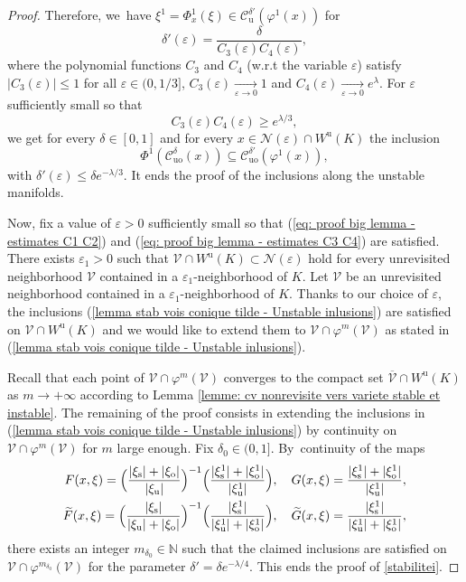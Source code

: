 \documentclass[JEP,XML,SOM,Unicode,NoEqCountersInSection,NoFloatCountersInSection,published]{cedram}
\newcommand{\ro}{\mathrm{o}}
\newcommand{\rs}{\mathrm{s}}
\newcommand{\ru}{\mathrm{u}}
\newcommand{\ruo}{\mathrm{uo}}
\theoremstyle{definition}
\theoremstyle{plain}
\newcommand{\Ccal}{\mathcal{C}}
\newcommand{\Ncal}{\mathcal{N}}
\newcommand{\N}{\mathbb{N}}
\newcommand{\Vcal}{\mathcal{V}}
\begin{document}
\begin{proof}
Therefore, we~have $\xi^1 = \Phi_x^1 (\xi) \in \Ccal_\ru^{\delta'}(\varphi^1 (x))$ for
\[
\delta'(\varepsilon) = \frac{\delta }{C_3 (\varepsilon) C_4 (\varepsilon)},
\]
where the polynomial functions $C_3$ and $C_4$ (w.r.t the variable $\varepsilon$) satisfy $|C_3 (\varepsilon)| \leq 1$ for all $\varepsilon\in(0,1/3]$, $ C_3 (\varepsilon) \underset{\varepsilon \to 0}{\to} 1$ and $C_4 (\varepsilon) \underset{\varepsilon \to 0}{\to} e^{\lambda}$. For $\varepsilon$ sufficiently small so that
\begin{equation}\label{eq: proof big lemma - estimates C3 C4}
C_3 (\varepsilon) C_4 (\varepsilon) \geq e^{\lambda/3},
\end{equation}
we get for every $\delta\in[0,1]$ and for every $x \in \Ncal (\varepsilon) \cap W^\ru(K)$ the inclusion
\[
\Phi^{1}\left(\Ccal_{\ruo}^{\delta}(x)\right) \subseteq \Ccal_{\ruo}^{\delta'}(\varphi^{1}(x)),
\]
with $\delta' (\varepsilon) \leq \delta e^{-\lambda/3}$. It ends the proof of the inclusions along the unstable manifolds.

\medskip
Now, fix a value of $\varepsilon > 0$ sufficiently small so that (\ref{eq: proof big lemma - estimates C1 C2}) and (\ref{eq: proof big lemma - estimates C3 C4}) are satisfied. There exists $\varepsilon_1 > 0$ such that $\Vcal \cap W^\ru (K) \subset \Ncal (\varepsilon)$ hold for every unrevisited neighborhood $\Vcal$ contained in a $\varepsilon_1$-neighborhood of $K$. Let $\Vcal$ be an unrevisited neighborhood contained in a $\varepsilon_1$-neighborhood of $K$. Thanks to our choice of $\varepsilon$, the inclusions (\ref{lemma stab vois conique tilde - Unstable inlusions}) are satisfied on $\Vcal \cap W^\ru (K)$ and we would like to extend them to $\Vcal \cap \varphi^m(\Vcal)$ as stated in (\ref{lemma stab vois conique tilde - Unstable inlusions}).

Recall that each point of $\Vcal \cap \varphi^m (\Vcal)$ converges to the compact set $\overline{\Vcal} \cap W^\ru (K)$ as $m \to + \infty$ according to Lemma \ref{lemme: cv nonrevisite vers variete stable et instable}. The remaining of the proof consists in extending the inclusions in (\ref{lemma stab vois conique tilde - Unstable inlusions}) by continuity on $\Vcal \cap \varphi^m (\Vcal)$ for $m$ large enough. Fix $\delta_0\in(0,1]$. By~continuity of the maps
\begin{align*}
F (x,\xi) = \Bigl(\frac{|\xi_\rs| + |\xi_\ro|}{|\xi_\ru|}\Bigr)^{-1} \Bigl(\frac{|\xi_\rs^1| + |\xi_\ro^1|}{|\xi_\ru^1|} \Bigr), \quad G (x,\xi) = \frac{|\xi_\rs^1| + |\xi_\ro^1|}{|\xi_\ru^1|}, \\
\widetilde{F} (x,\xi) = \Bigl(\frac{|\xi_\rs|}{|\xi_\ru| + |\xi_\ro|}\Bigr)^{-1} \Bigl(\frac{|\xi_\rs^1|}{|\xi_\ru^1| + |\xi_\ro^1|} \Bigr), \quad \widetilde{G} (x,\xi) = \frac{|\xi_\rs^1|}{|\xi_\ru^1| + |\xi_\ro^1|},
\end{align*}
there exists an integer $m_{\delta_0} \in \N$ such that the claimed inclusions are satisfied on $\Vcal \cap \varphi^{m_{\delta_0}} (\Vcal)$ for the parameter $\delta' = \delta e^{-\lambda/4}$. This ends the proof of \eqref{stabilitei}.


\end{proof}
\end{document}
